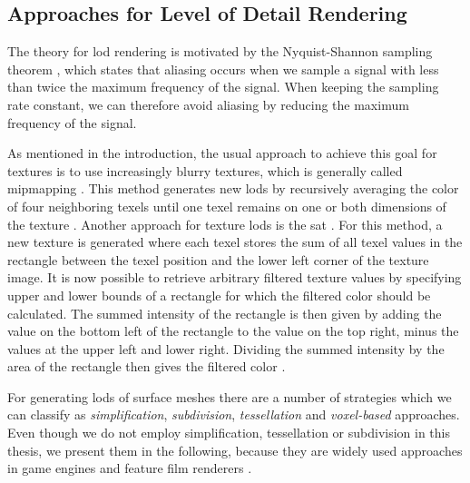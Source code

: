 \subsection{Approaches for Level of Detail Rendering}
The theory for \ac{lod} rendering is motivated by the Nyquist-Shannon sampling theorem \cite{shannonsampling}, which states that aliasing occurs when we sample a signal with less than twice the maximum frequency of the signal.
When keeping the sampling rate constant, we can therefore avoid aliasing by reducing the maximum frequency of the signal.

As mentioned in the introduction, the usual approach to achieve this goal for textures is to use increasingly blurry textures, which is generally called mipmapping \cite{mipmapping}.
This method generates new \acsp{lod} by recursively averaging the color of four neighboring texels until one texel remains on one or both dimensions of the texture \cite{mipmapping}.
Another approach for texture \acsp{lod} is the \ac{sat} \cite{crow_summed_area_tables}.
For this method, a new texture is generated where each texel stores the sum of all texel values in the rectangle between the texel position and the lower left corner of the texture image.
It is now possible to retrieve arbitrary filtered texture values by specifying upper and lower bounds of a rectangle for which the filtered color should be calculated.
The summed intensity of the rectangle is then given by adding the value on the bottom left of the rectangle to the value on the top right, minus the values at the upper left and lower right.
Dividing the summed intensity by the area of the rectangle then gives the filtered color \cite{crow_summed_area_tables}.

For generating \acsp{lod} of surface meshes there are a number of strategies which we can classify as \textit{simplification}, \textit{subdivision}, \textit{tessellation} and \textit{voxel-based} approaches.
Even though we do not employ simplification, tessellation or subdivision in this thesis, we present them in the following, because they are widely used approaches in game engines \cite{niessner_tessellation} and feature film renderers \cite{arnold}.


